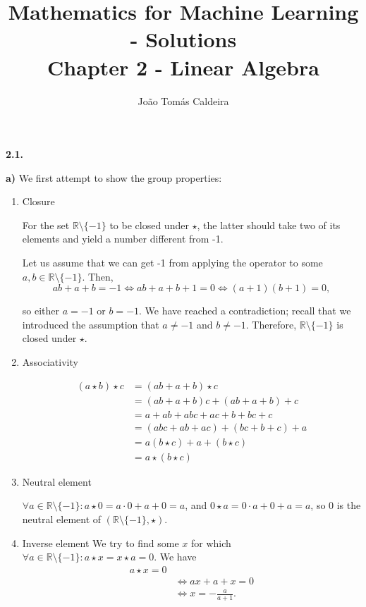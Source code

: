 \documentclass{article}
\title{\LARGE Mathematics for Machine Learning - Solutions\\
    \Large Chapter 2 - Linear Algebra}
\author{João Tomás Caldeira}
\date{}
\def\R{{\mathbb{R}}}
\begin{document}
\maketitle

\textbf{2.1.}

\textbf{a)} We first attempt to show the group properties:

\begin{enumerate}
    \item Closure
    
    For the set $\R \setminus \{-1\}$ to be closed under $\star$, the latter should take two of its elements and yield a number different from -1.
    
    Let us assume that we can get -1 from applying the operator to some $a, b \in \R \setminus \{-1\}$. Then,
    \begin{equation}
        ab + a + b = -1 \iff ab + a + b + 1 = 0 \iff (a + 1)(b + 1) = 0,
    \end{equation}
    
    so either $a = -1$ or $b = -1$. We have reached a contradiction; recall that we introduced the assumption that $a \neq -1$ and $b \neq -1$. Therefore, $\R \setminus \{-1\}$ is closed under $\star$.
    
    \item Associativity
    
    \begin{equation}
    \begin{split}
        (a \star b) \star c & = (ab + a + b) \star c \\ & =  (ab + a + b)c + (ab + a + b) + c \\ & = a + ab + abc + ac + b + bc + c \\ & = (abc + ab + ac) + (bc + b + c) + a \\ & = a(b \star c) + a + (b \star c) \\ & = a \star (b \star c)
    \end{split}
    \end{equation}
    
    \item Neutral element
    
    $\forall a \in \R \setminus \{-1\}: a \star 0 = a \cdot 0 + a + 0 = a$, and $0 \star a = 0 \cdot a + 0 + a = a$, so 0 is the neutral element of $(\R \setminus \{-1\}, \star)$.
    
    \item Inverse element
    We try to find some $x$ for which $\forall a \in \R \setminus \{-1\}: a \star x = x \star a = 0$. We have
    \begin{equation}\label{2.1.a.inverse}
    \begin{split}
        a \star x = 0 \\ & \iff ax + a + x = 0 \\ & \iff x = -\frac{a}{a + 1}.
    \end{split}
    \end{equation}
    

\end{enumerate}
\end{document}
